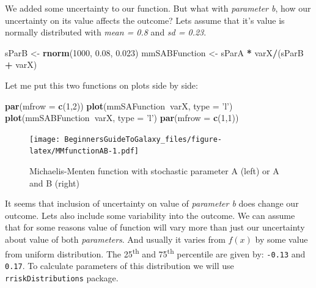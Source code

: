 \documentclass[]{book}
\newenvironment{Shaded}{\begin{snugshade}}{\end{snugshade}}
\newcommand{\KeywordTok}[1]{\textcolor[rgb]{0.13,0.29,0.53}{\textbf{#1}}}
\newcommand{\DataTypeTok}[1]{\textcolor[rgb]{0.13,0.29,0.53}{#1}}
\newcommand{\DecValTok}[1]{\textcolor[rgb]{0.00,0.00,0.81}{#1}}
\newcommand{\FloatTok}[1]{\textcolor[rgb]{0.00,0.00,0.81}{#1}}
\newcommand{\StringTok}[1]{\textcolor[rgb]{0.31,0.60,0.02}{#1}}
\newcommand{\OperatorTok}[1]{\textcolor[rgb]{0.81,0.36,0.00}{\textbf{#1}}}
\newcommand{\NormalTok}[1]{#1}
\theoremstyle{definition}
\theoremstyle{definition}
\theoremstyle{definition}
\theoremstyle{remark}
\begin{document}
We added some uncertainty to our function. But what with \emph{parameter
b}, how our uncertainty on its value affects the outcome? Lets assume
that it's value is normally distributed with \emph{mean = 0.8} and
\emph{sd = 0.23}.

\begin{Shaded}
\begin{Highlighting}[]
\NormalTok{sParB <-}\StringTok{ }\KeywordTok{rnorm}\NormalTok{(}\DecValTok{1000}\NormalTok{, }\FloatTok{0.08}\NormalTok{, }\FloatTok{0.023}\NormalTok{) }
\NormalTok{mmSABFunction <-}\StringTok{ }\NormalTok{sParA }\OperatorTok{*}\StringTok{ }\NormalTok{varX}\OperatorTok{/}\NormalTok{(sParB }\OperatorTok{+}\StringTok{ }\NormalTok{varX)}
\end{Highlighting}
\end{Shaded}

Let me put this two functions on plots side by side:

\begin{Shaded}
\begin{Highlighting}[]
\KeywordTok{par}\NormalTok{(}\DataTypeTok{mfrow =} \KeywordTok{c}\NormalTok{(}\DecValTok{1}\NormalTok{,}\DecValTok{2}\NormalTok{))}
\KeywordTok{plot}\NormalTok{(mmSAFunction}\OperatorTok{~}\NormalTok{varX, }\DataTypeTok{type =} \StringTok{'l'}\NormalTok{)}
\KeywordTok{plot}\NormalTok{(mmSABFunction}\OperatorTok{~}\NormalTok{varX, }\DataTypeTok{type =} \StringTok{'l'}\NormalTok{)}
\KeywordTok{par}\NormalTok{(}\DataTypeTok{mfrow =} \KeywordTok{c}\NormalTok{(}\DecValTok{1}\NormalTok{,}\DecValTok{1}\NormalTok{))}
\end{Highlighting}
\end{Shaded}

\begin{figure}
\centering
\texttt{[image: BeginnersGuideToGalaxy\_files/figure-latex/MMfunctionAB-1.pdf]}
\caption{\label{fig:MMfunctionAB}Michaelis-Menten function with stochastic
parameter A (left) or A and B (right)}
\end{figure}

It seems that inclusion of uncertainty on value of \emph{parameter b}
does change our outcome. Lets also include some variability into the
outcome. We can assume that for some reasons value of function will vary
more than just our uncertainty about value of both \emph{parameters}.
And usually it varies from \(f(x)\) by some value from uniform
distribution. The 25\textsuperscript{th} and 75\textsuperscript{th}
percentile are given by: \texttt{-0.13} and \texttt{0.17}. To calculate
parameters of this distribution we will use \texttt{rriskDistributions}
package.
\end{document}
